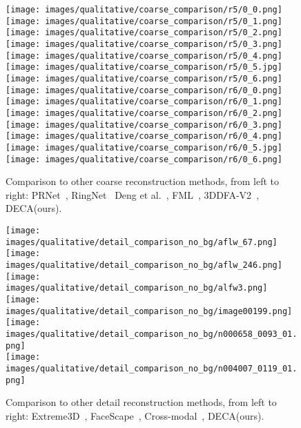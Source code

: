 \documentclass[final]{cvpr}
\newcommand{\modelname}{DECA\xspace}
\begin{document}
\begin{figure}[t]
    \texttt{[image: images/qualitative/coarse\_comparison/r5/0\_0.png]}\texttt{[image: images/qualitative/coarse\_comparison/r5/0\_1.png]}\texttt{[image: images/qualitative/coarse\_comparison/r5/0\_2.png]}\texttt{[image: images/qualitative/coarse\_comparison/r5/0\_3.png]}\texttt{[image: images/qualitative/coarse\_comparison/r5/0\_4.png]}\texttt{[image: images/qualitative/coarse\_comparison/r5/0\_5.jpg]}\texttt{[image: images/qualitative/coarse\_comparison/r5/0\_6.png]}\\  
    \texttt{[image: images/qualitative/coarse\_comparison/r6/0\_0.png]}\texttt{[image: images/qualitative/coarse\_comparison/r6/0\_1.png]}\texttt{[image: images/qualitative/coarse\_comparison/r6/0\_2.png]}\texttt{[image: images/qualitative/coarse\_comparison/r6/0\_3.png]}\texttt{[image: images/qualitative/coarse\_comparison/r6/0\_4.png]}\texttt{[image: images/qualitative/coarse\_comparison/r6/0\_5.jpg]}\texttt{[image: images/qualitative/coarse\_comparison/r6/0\_6.png]}  
    \caption{Comparison to other coarse reconstruction methods, from left to right: PRNet~\cite{Feng2018}, RingNet~\cite{Sanyal2019} Deng et al.~\cite{Deng2019}, FML~\cite{Tewari2019}, 3DDFA-V2~\cite{guo2020towards}, \modelname (ours).}
    \label{fig:qualitative1}
\end{figure}

\begin{figure}[t]
    \offinterlineskip
        \texttt{[image: images/qualitative/detail\_comparison\_no\_bg/aflw\_67.png]}\\ 
        \texttt{[image: images/qualitative/detail\_comparison\_no\_bg/aflw\_246.png]}\\ 
        \texttt{[image: images/qualitative/detail\_comparison\_no\_bg/alfw3.png]}\\ 
        \texttt{[image: images/qualitative/detail\_comparison\_no\_bg/image00199.png]}\\ 
        \texttt{[image: images/qualitative/detail\_comparison\_no\_bg/n000658\_0093\_01.png]}\\ 
        \texttt{[image: images/qualitative/detail\_comparison\_no\_bg/n004007\_0119\_01.png]} 
    \caption{Comparison to other detail reconstruction methods, from left to right: Extreme3D~\cite{AnhTran2018}, FaceScape~\cite{yang2020facescape}, Cross-modal~\cite{Abrevaya2020}, \modelname (ours).}
    \label{fig:qualitative2}
\end{figure}
\end{document}
